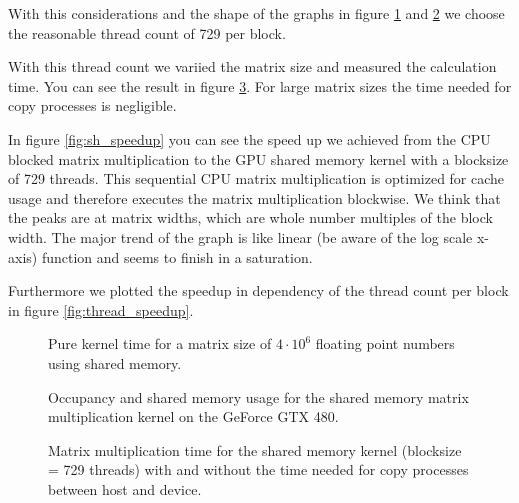 \documentclass[DIV=12,oneside,a4paper]{scrartcl}
\begin{document}
With this considerations and the shape of the graphs
in figure \ref{fig:sh_thread_count} and \ref{fig:occupancy}
we choose the reasonable thread count of 729 per block.

With this thread count we variied the matrix size and measured
the calculation time. You can see the result in figure \ref{fig:sh_size}.
For large matrix sizes the time needed for copy processes is negligible.

In figure \ref{fig:sh_speedup} you can see the speed up we achieved
from the CPU blocked matrix multiplication to the GPU shared memory
kernel with a blocksize of 729 threads. This sequential CPU matrix 
multiplication is optimized for cache usage and therefore executes
the matrix multiplication blockwise. We think that the peaks are
at matrix widths, which are whole number multiples of the block width.
The major trend of the graph is like linear (be aware of the log scale x-axis)
function and seems to finish in a saturation. 

Furthermore we plotted the speedup in dependency of the thread count
per block in figure \ref{fig:thread_speedup}. 
\begin{figure}
    \begin{center}
        
    \end{center}
    \caption{Pure kernel time for a matrix size of $4\cdot 10^{6}$
        floating point numbers using shared memory.}
    \label{fig:sh_thread_count}
\end{figure}

\begin{figure}
    \begin{center}
        
    \end{center}
    \caption{Occupancy and shared memory usage for the shared memory
        matrix multiplication kernel on the GeForce GTX 480.}
    \label{fig:occupancy}
\end{figure}

\begin{figure}
    \begin{center}
        
    \end{center}
    \caption{Matrix multiplication time for the shared memory kernel
        (blocksize = 729 threads)
        with and without the time needed for copy processes between
        host and device.}
    \label{fig:sh_size}
\end{figure}
\end{document}
